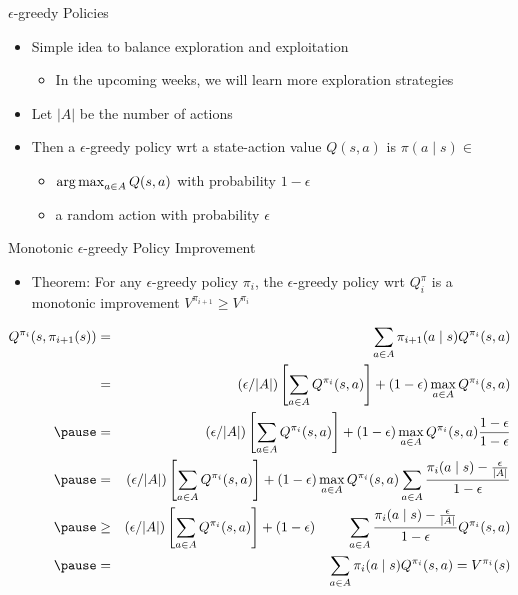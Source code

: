 \documentclass[aspectratio=169]{../latex_main/tntbeamer}  %
\begin{document}
\begin{frame}[c]{$\epsilon$-greedy Policies}
	
	\begin{itemize}
	\item Simple idea to balance exploration and exploitation
	\begin{itemize}
	    \item In the upcoming weeks, we will learn more exploration strategies
	\end{itemize}
	\item Let $|A|$ be the number of actions
	\item Then a $\epsilon$-greedy policy wrt a state-action value $Q(s,a)$ is $\pi(a\mid s) \in $
	\begin{itemize}
		\item $\operatorname*{arg\,max}_{a\in A} Q(s,a)$ with probability $1 - \epsilon$
		\item a random action with probability $\epsilon$
	\end{itemize}
\end{itemize}
	
\end{frame}
\begin{frame}[c]{Monotonic $\epsilon$-greedy Policy Improvement}
	\vspace{-1em}
	\begin{itemize}
		\item Theorem: For any $\epsilon$-greedy policy $\pi_i$, the $\epsilon$-greedy policy wrt $Q^{\pi}_i$ is a monotonic improvement $V^{\pi_{i+1}} \geq V^{\pi_i}$
	\end{itemize}

\footnotesize
	\vspace{-1em}
\begin{eqnarray}
Q^{\pi_i} (s,\pi_{i+1} (s)) &=& \sum_{a \in A} \pi_{i+1}(a \mid s) Q^{\pi_{i}}(s,a)\nonumber\\
	&=& (\epsilon / |A|) \left[\sum_{a\in A} Q^{\pi_{i}}(s,a) \right] + (1- \epsilon) \max_{a\in A} Q^{\pi_{i}}(s,a)\nonumber\\ \pause
	&=& (\epsilon / |A|) \left[\sum_{a\in A} Q^{\pi_{i}}(s,a) \right] + (1- \epsilon) \max_{a\in A} Q^{\pi_{i}}(s,a)\frac{1-\epsilon}{1-\epsilon}\nonumber\\ \pause
	&=& (\epsilon / |A|) \left[\sum_{a\in A} Q^{\pi_{i}}(s,a) \right] + (1- \epsilon) \max_{a\in A} Q^{\pi_{i}}(s,a)\sum_{a\in A}\frac{\pi_i(a\mid s) - \frac{\epsilon}{|A|}}{1-\epsilon}\nonumber\\ \pause
	&\geq& (\epsilon / |A|) \left[\sum_{a\in A} Q^{\pi_{i}}(s,a) \right] + (1- \epsilon) \qquad~ \sum_{a\in A}\frac{\pi_i(a\mid s) - \frac{\epsilon}{|A|}}{1-\epsilon} Q^{\pi_{i}}(s,a) \nonumber\\ \pause
	&=& \sum_{a\in A} \pi_i (a \mid s) Q^{\pi_i}(s,a) = V^{\pi_i}(s)\nonumber
\end{eqnarray}
	
\end{frame}
\end{document}
